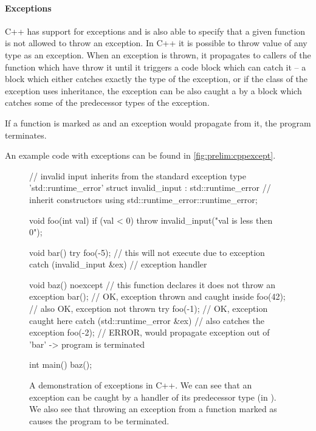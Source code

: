 \paragraph{Exceptions}

C++ has support for exceptions and is also able to specify that a given function
is not allowed to throw an exception.
In C++ it is possible to throw value of any type as an exception.
When an exception is thrown, it propagates to callers of the function which
have throw it until it triggers a  code block which can catch it --
a  block which either catches exactly the type of the exception, or
if the class of the exception uses inheritance, the exception can be also
caught a by a  block which catches some of the predecessor types of
the exception.

If a function is marked as  and an exception would propagate from
it, the program terminates.

An example code with exceptions can be found in \autoref{fig:prelim:cppexcept}.

\begin{figure}[tp]
    \begin{cppcode}
        // invalid input inherits from the standard exception type 'std::runtime_error'
        struct invalid_input : std::runtime_error {
            // inherit constructors
            using std::runtime_error::runtime_error;
        }

        void foo(int val) {
            if (val < 0)
                throw invalid_input("val is less then 0");
        }

        void bar() {
            try {
                foo(-5);
                // this will not execute due to exception
            } catch (invalid_input &ex) {
                // exception handler
            }
        }

        void baz() noexcept { // this function declares it does not throw an exception
            bar(); // OK, exception thrown and caught inside
            foo(42); // also OK, exception not thrown
            try {
                foo(-1); // OK, exception caught here
            } catch (std::runtime_error &ex) {
                // also catches the exception
            }
            foo(-2); // ERROR, would propagate exception out of 'bar' -> program is terminated
        }

        int main() { baz(); }
    \end{cppcode}
    \caption{A demonstration of exceptions in C++.
    We can see that an exception can be caught by a  handler of its
    predecessor type (in ).
    We also see that throwing an exception from a function marked as
     causes the program to be terminated.
    }\label{fig:prelim:cppexcept}
\end{figure}


